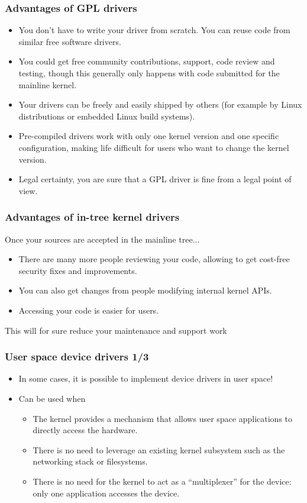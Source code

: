 \begin{frame}
  \frametitle{Advantages of GPL drivers}
  \begin{itemize}
  \item You don't have to write your driver from scratch. You can
    reuse code from similar free software drivers.
  \item You could get free community contributions, support, code
    review and testing, though this generally only happens with code
    submitted for the mainline kernel.
  \item Your drivers can be freely and easily shipped by others (for
    example by Linux distributions or embedded Linux build systems).
  \item Pre-compiled drivers work with only one kernel version and one
    specific configuration, making life difficult for users who want
    to change the kernel version.
  \item Legal certainty, you are sure that a GPL driver is fine from a
    legal point of view.
  \end{itemize}
\end{frame}

\begin{frame}
  \frametitle{Advantages of in-tree kernel drivers}
  Once your sources are accepted in the mainline tree...
  \begin{itemize}
  \item There are many more people reviewing your code, allowing to
    get cost-free security fixes and improvements.
  \item You can also get changes from people modifying internal
    kernel APIs.
  \item Accessing your code is easier for users.
  \end{itemize}
  This will for sure reduce your maintenance and support work
\end{frame}

\begin{frame}
  \frametitle{User space device drivers 1/3}
  \begin{itemize}
  \item In some cases, it is possible to implement device drivers in
    user space!
  \item Can be used when
    \begin{itemize}
    \item The kernel provides a mechanism that allows user space
      applications to directly access the hardware.
    \item There is no need to leverage an existing kernel subsystem
      such as the networking stack or filesystems.
    \item There is no need for the kernel to act as a ``multiplexer''
      for the device: only one application accesses the device.
    \end{itemize}
  \end{itemize}
\end{frame}

